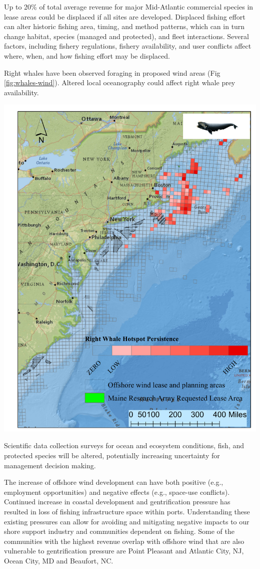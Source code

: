 \documentclass[
  10pt,
]{article}
\let\origfigure\figure
\let\endorigfigure\endfigure
\renewenvironment{figure}[1][2] {
    \expandafter\origfigure\expandafter[H]
} {
    \endorigfigure
}
\begin{document}
Up to 20\% of total average revenue for major Mid-Atlantic commercial
species in lease areas could be displaced if all sites are developed.
Displaced fishing effort can alter historic fishing area, timing, and
method patterns, which can in turn change habitat, species (managed and
protected), and fleet interactions. Several factors, including fishery
regulations, fishery availability, and user conflicts affect where,
when, and how fishing effort may be displaced.

Right whales have been observed foraging in proposed wind areas (Fig
\ref{fig:whales-wind}). Altered local oceanography could affect right
whale prey availability.

\begin{figure}

{\centering \includegraphics[width=0.6\linewidth]{images/NARW_hotpsot_persistence_2_1_2022_TPW} 

}

\caption{Northern Right Whale persistent hotspots and Wind Energy Areas.}\label{fig:whales-wind}
\end{figure}

Scientific data collection surveys for ocean and ecosystem conditions,
fish, and protected species will be altered, potentially increasing
uncertainty for management decision making.

The increase of offshore wind development can have both positive (e.g.,
employment opportunities) and negative effects (e.g., space-use
conflicts). Continued increase in coastal development and gentrification
pressure has resulted in loss of fishing infrastructure space within
ports. Understanding these existing pressures can allow for avoiding and
mitigating negative impacts to our shore support industry and
communities dependent on fishing. Some of the communities with the
highest revenue overlap with offshore wind that are also vulnerable to
gentrification pressure are Point Pleasant and Atlantic City, NJ, Ocean
City, MD and Beaufort, NC.
\end{document}
